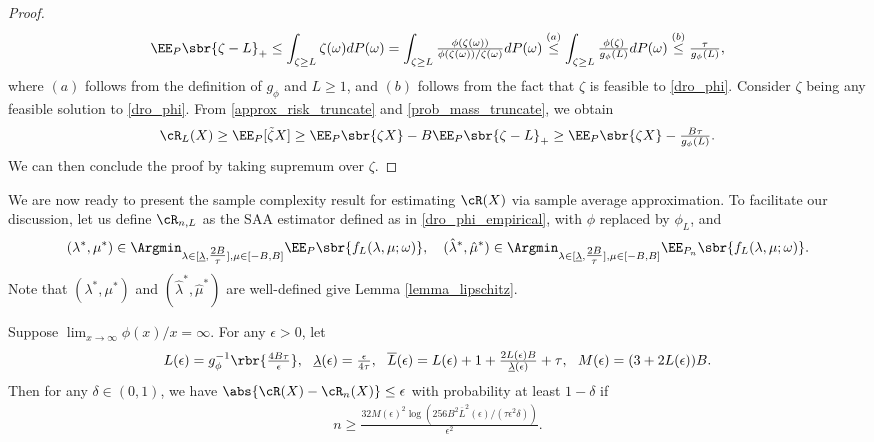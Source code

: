 \documentclass[9pt]{article} %
\numberwithin{equation}{section}
\renewcommand{\frac}[2]{\tfrac{#1}{#2}}
\begin{document}
\begin{proof}
\begin{align}
 \EE_P \sbr{\zeta - L}_+ \leq \int_{\zeta \geq L}  \zeta(\omega) dP(\omega) =  \int_{\zeta \geq L}  \frac{ \phi(\zeta(\omega))}{\phi(\zeta(\omega)) / \zeta(\omega)}  dP(\omega)
 \overset{(a)}{\leq} \int_{\zeta \geq L} \frac{\phi(\zeta)}{g_\phi(L)} dP(\omega) \overset{(b)}{\leq} \frac{\tau}{g_\phi(L)},
\end{align}
where $(a)$ follows from the definition of $g_\phi$ and $L \geq 1$, and $(b)$ follows from the fact that $\zeta$ is feasible to \eqref{dro_phi}.
Consider $\zeta$ being any feasible solution to \eqref{dro_phi}. From  \eqref{approx_risk_truncate} and \eqref{prob_mass_truncate},  we obtain
\begin{align*}
\cR_L(X) \geq \EE_P [{\tilde{\zeta} X} ] \geq \EE_P \sbr{\zeta X} - B \EE_P \sbr{\zeta - L}_+ \geq \EE_P \sbr{\zeta X}  - \frac{B \tau}{g_\phi(L)}.
\end{align*}
We can then conclude the proof by taking supremum over $\zeta$.
\end{proof}




We are now ready to present the sample complexity result for 
 estimating $\cR(X)$ via sample average approximation.
To facilitate our discussion, let us define $\cR_{n, L}$ as the SAA estimator defined as in \eqref{dro_phi_empirical}, with $\phi$ replaced by $\phi_L$,
and 
\begin{align}\label{eq_def_optimal_dual}
(\lambda^*, \mu^*) \in \Argmin_{\lambda \in [\underline{\lambda}, \frac{2B}{\tau}], \mu \in [-B, B]} \EE_P \sbr{f_L(\lambda, \mu; \omega)}, ~~~ 
(\hat{\lambda}^*, \hat{\mu}^*) \in \Argmin_{\lambda \in [\underline{\lambda}, \frac{2B}{\tau}], \mu \in [-B, B]} \EE_{P_n} \sbr{f_L(\lambda, \mu; \omega)}.
\end{align}
Note that $(\lambda^*, \mu^*)$ and $(\hat{\lambda}^*, \hat{\mu}^*)$ are well-defined give Lemma \ref{lemma_lipschitz}.


\begin{theorem}\label{thrm_sample_p_independent_truncation}
Suppose $\lim_{x \to \infty} \phi(x) / x = \infty$. 
For any $\epsilon > 0$, let 
 \begin{align}\label{eq_lip_m_constants}
 L(\epsilon)  =  g_\phi^{-1}\rbr{\frac{4 B\tau }{ \epsilon}} , ~~ \underline{\lambda}(\epsilon) =\frac{\epsilon}{4\tau}, ~ ~
 \overline{L} (\epsilon) = {L (\epsilon) +1 +  \frac{2L(\epsilon)B}{\underline{\lambda}(\epsilon)}  + \tau},  ~~ 
 M(\epsilon) = 
  (3 + 2L(\epsilon) ) B  .
 \end{align}
 Then for any $\delta \in (0,1)$, we have $\abs{\cR(X) - \cR_n(X)} \leq \epsilon$ with probability at least $1-\delta$
 if 
 \begin{align*}
 n \geq 
 \frac{
 32 M(\epsilon)^2 \log(256 B^2 \overline{L}^2 (\epsilon)/ (\tau \epsilon^2 \delta)) 
 }{\epsilon^2}.
 \end{align*}
\end{theorem}
\end{document}
